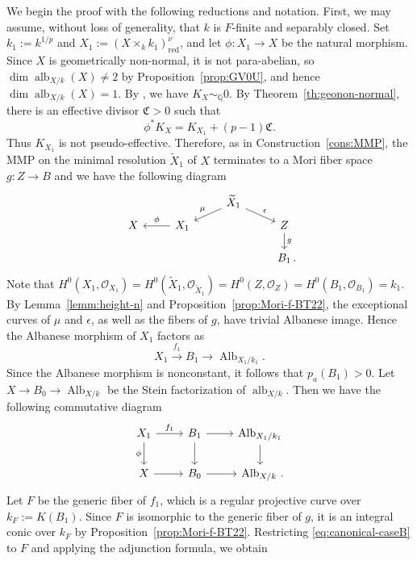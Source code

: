 \documentclass[10pt,abstract=true]{scrartcl}
\numberwithin{equation}{section}
\theoremstyle{definition}
\theoremstyle{remark}
\def\simQ{\sim_{\mathbb Q}} \def\geQ{\ge_{\mathbb Q}}
\DeclareMathOperator\Alb{Alb}
\DeclareMathOperator\alb{alb}
\begin{document}
We begin the proof with the following reductions and notation.
First, we may assume, without loss of generality, that $k$ is $F$-finite and separably closed.
Set $k_1:=k^{1/p}$ and $X_1:=(X\times_k k_1)_{\mathrm{red}}^\nu$, and let $\phi\colon X_1\to X$ be the natural morphism.
Since $X$ is geometrically non-normal, it is not para-abelian, so $\dim\alb_{X/k}(X)\ne2$ by Proposition~\ref{prop:GV0U}, and hence $\dim\alb_{X/k}(X)=1$.
By \cite[Theorem~1.1]{tanaka_abundance_2020}, we have $K_X\simQ0$.
By Theorem~\ref{th:geonon-normal}, there is an effective divisor $\mathfrak C>0$ such that
\begin{equation}\label{eq:canonical-caseB}
  \phi^*K_X=K_{X_1}+(p-1)\mathfrak C.
\end{equation}
Thus $K_{X_1}$ is not pseudo-effective.
Therefore, as in Construction~\ref{cons:MMP}, the MMP on the minimal resolution $\widetilde X_1$ of $X$ terminates to a Mori fiber space $g\colon Z\to B$ and we have the following diagram
\begin{equation}\label{eq:mmp-alb}
  \begin{tikzcd}[row sep=tiny]
    && \widetilde X_1 \ar[ld,"\mu"'] \ar[rd,"\epsilon"]\\
    X & X_1 \ar[l,"\phi"'] && Z \ar[d,"g"]\\[2ex]
      &&& B_1\rlap{\,.}
  \end{tikzcd}
\end{equation}
Note that $H^0(X_1,\mathcal O_{X_1})=H^0(\widetilde X_1,\mathcal O_{\widetilde X_1})=H^0(Z,\mathcal O_Z)=H^0(B_1,\mathcal O_{B_1})=k_1$. 
By Lemma~\ref{lemm:height-n} and Proposition~\ref{prop:Mori-f-BT22}, the exceptional curves of $\mu$ and $\epsilon$, as well as the fibers of $g$, have trivial Albanese image.
Hence the Albanese morphism of $X_1$ factors as
\[
  X_1\xrightarrow{f_1}B_1\longrightarrow\Alb_{X_1/k_1}.
\]
Since the Albanese morphism is nonconstant, it follows that $p_a(B_1)>0$.
Let $X\to B_0\to\Alb_{X/k}$ be the Stein factorization of $\alb_{X/k}$. Then we have the following commutative diagram
\[
  \begin{tikzcd}
    X_1 \ar[r,"f_1"] \ar[d,"\phi"'] & B_1 \ar[r] \ar[d] & \Alb_{X_1/k_1} \ar[d] \\
    X \ar[r] & B_0 \ar[r] & \Alb_{X/k}\rlap{\,.}
  \end{tikzcd}
\]
Let $F$ be the generic fiber of $f_1$, which is a regular projective curve over $k_F:=K(B_1)$.
Since $F$ is isomorphic to the generic fiber of $g$, it is an integral conic over $k_F$ by Proposition~\ref{prop:Mori-f-BT22}.
Restricting \eqref{eq:canonical-caseB} to $F$ and applying the adjunction formula, we obtain
\end{document}
